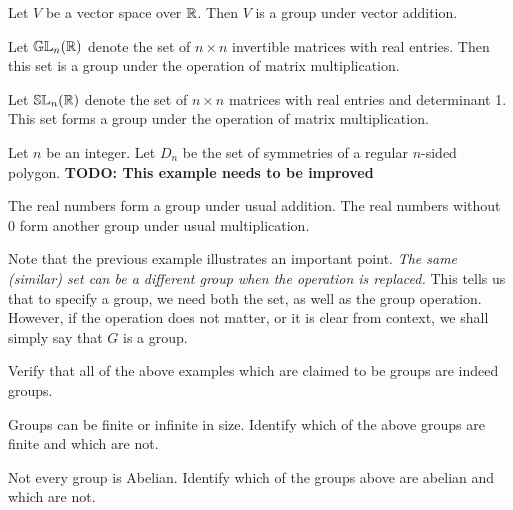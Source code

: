 \documentclass[./algebra-notes.tex]{subfiles}
\begin{document}
\begin{example}
    Let $V$ be a vector space over $\mathbb{R}$. Then $V$ is a group under vector
    addition.
\end{example}

\begin{example}
    Let $\mathbb{GL}_n(\mathbb{R})$ denote the set of $n \times n$ invertible matrices
    with real entries. Then this set is a group under the operation of matrix
    multiplication.
\end{example}

\begin{example}
    Let $\mathbb{SL}_n(\mathbb{R})$ denote the set of $n \times n$ matrices with real
    entries and determinant 1. This set forms a group under the operation of
    matrix multiplication.
\end{example}

\begin{example}
    Let $n$ be an integer. Let $D_n$ be the set of symmetries of a regular
    $n$-sided polygon. \textbf{TODO: This example needs to be improved}
\end{example}

\begin{example}
    The real numbers form a group under usual addition. The real numbers without
    $0$ form another group under usual multiplication.
\end{example}

Note that the previous example illustrates an important point. \emph{The same
(similar) set can be a different group when the operation is replaced.} This
tells us that to specify a group, we need both the set, as well as the group
operation. However, if the operation does not matter, or it is clear from
context, we shall simply say that $G$ is a group.

\begin{exercise}
    Verify that all of the above examples which are claimed to be groups are
    indeed groups. 
\end{exercise}

\begin{exercise}
    Groups can be finite or infinite in size. Identify which of the above groups
    are finite and which are not.
\end{exercise}

\begin{exercise}
    Not every group is Abelian. Identify which of the groups above are abelian
    and which are not.
\end{exercise}
\end{document}

